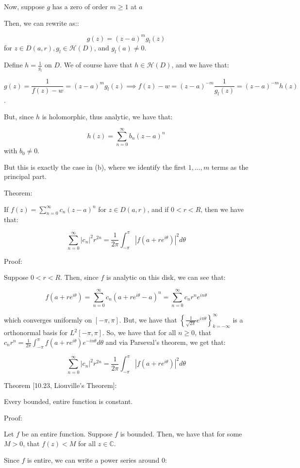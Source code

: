 \documentclass[10pt]{article}
\newcommand{\calH}{\mathcal{H}}
\begin{document}
Now, suppose $g$ has a zero of order $m \geq 1$ at $a$

Then, we can rewrite as::

$$g(z) = (z-a)^m g_l(z) $$ for $z \in D(a,r), g_l \in \calH(D)$, and $g_l(a) \not = 0$.

Define $h = \frac{1}{g_l}$ on $D$. We of course have that $h \in \calH(D)$, and we have that:

$$ g(z) = \frac{1}{f(z) - w} = (z-a)^m g_l(z) \implies f(z) - w = (z-a)^{-m} \frac{1}{g_l(z)} =  (z-a)^{-m} h(z)$$.

But, since $h$ is holomorphic, thus analytic, we have that:

$$h(z) = \sum_{n=0}^\infty b_n (z-a)^n$$ with $b_0 \not = 0$.

But this is exactly the case in (b), where we identify the first $1,...,m$ terms as the principal part.

Theorem:

If $f(z) = \sum_{n=0}^\infty c_n (z-a)^n$ for $z \in D(a,r)$, and if $0 < r < R$, then we have that:

$$ \sum_{n=0}^\infty |c_n|^2 r^{2n} = \frac{1}{2\pi} \int_{-\pi}^\pi | f(a + re^{i\theta})|^2 d\theta $$

Proof:

Suppose $0 < r < R$. Then, since $f$ is analytic on this disk, we can see that:

$$f(a + re^{i\theta}) = \sum_{n=0}^\infty c_n (a + re^{i\theta} - a)^n = \sum_{n=0}^\infty c_n r^n e^{in\theta}$$

which converges uniformly on $[-\pi, \pi]$. But, we have that $\left\{ \frac{1}{\sqrt{2\pi}} e^{i \pi \theta } \right\}_{k=-\infty}^\infty$ is a orthonormal basis for $L^2[-\pi,\pi]$. So, we have that for all $n \geq 0$, that $c_n r^n = \frac{1}{2\pi} \int_{-\pi}^\pi f(a + re^{i\theta}) e^{-in \theta} d\theta$ and via Parseval’s theorem, we get that:

$$ \sum_{n=0}^\infty | c_n|^2 r^{2n} = \frac{1}{2\pi} \int_{-\pi}^\pi |f(a + r e^{i\theta})|^2 d\theta$$

Theorem [10.23, Liouville’s Theorem]:

Every bounded, entire function is constant.

Proof:

Let $f$ be an entire function. Suppose $f$ is bounded. Then, we have that for some $M > 0$, that $f(z) < M$ for all $z \in \mathbb{C}$.

Since $f$ is entire, we can write a power series around $0$:
\end{document}

